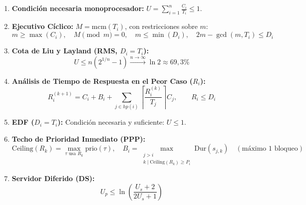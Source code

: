 \begin{tcolorbox}[colback=scdGray,colframe=scdDarkBlue,title=\textbf{\textsf{Formulario Rápido de Sistemas de Tiempo Real}},arc=4pt]
\small
\begin{enumerate}[leftmargin=*]
    \item \textbf{Condición necesaria monoprocesador:} $U = \sum_{i=1}^n \frac{C_i}{T_i} \le 1$.
    \item \textbf{Ejecutivo Cíclico:}
    $M = \text{mcm}(T_i)$, con restricciones sobre $m$:
    $$m \ge \max(C_i), \quad M \pmod m = 0, \quad m \le \min(D_i), \quad 2m - \gcd(m, T_i) \le D_i$$
    \item \textbf{Cota de Liu y Layland (RMS, $D_i = T_i$):}
    $$U \le n(2^{1/n} - 1) \xrightarrow{n \to \infty} \ln 2 \approx 69{,}3\%$$
    \item \textbf{Análisis de Tiempo de Respuesta en el Peor Caso ($R_i$):}
    $$R_i^{(k+1)} = C_i + B_i + \sum_{j \in hp(i)} \left\lceil \frac{R_i^{(k)}}{T_j} \right\rceil C_j, \qquad R_i \le D_i$$
    \item \textbf{EDF ($D_i = T_i$):} Condición necesaria y suficiente: $U \le 1$.
    \item \textbf{Techo de Prioridad Inmediato (PPP):} 
    $$\text{Ceiling}(R_k) = \max_{\tau \text{ usa } R_k} \text{prio}(\tau), \quad B_i = \max_{\substack{j > i \\ k \mid \text{Ceiling}(R_k) \ge P_i}} \text{Dur}(s_{j,k}) \quad (\text{máximo 1 bloqueo})$$
    \item \textbf{Servidor Diferido (DS):}
    $$U_p \le \ln \left( \frac{U_s + 2}{2U_s + 1} \right)$$
\end{enumerate}
\end{tcolorbox}
